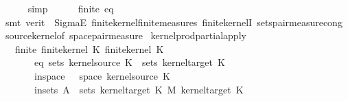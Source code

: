 \begin{isabellebody}
\ \ \ \ \isamarkupfalse%
\ simp\isanewline
\ \ \ \ \isamarkupfalse%
\ finite\ eq\isanewline
\ \ \ \ \isamarkupfalse%
\ {\isacharparenleft}{\kern0pt}smt\ {\isacharparenleft}{\kern0pt}verit{\isacharparenright}{\kern0pt}\ {}\ SigmaE\ finite{\isacharunderscore}{\kern0pt}kernel{\isachardot}{\kern0pt}finite{\isacharunderscore}{\kern0pt}measures\ finite{\isacharunderscore}{\kern0pt}kernelI\ sets{\isacharunderscore}{\kern0pt}pair{\isacharunderscore}{\kern0pt}measure{\isacharunderscore}{\kern0pt}cong\ source{\isacharunderscore}{\kern0pt}kernel{\isacharunderscore}{\kern0pt}of\ space{\isacharunderscore}{\kern0pt}pair{\isacharunderscore}{\kern0pt}measure{\isacharparenright}{\kern0pt}\isanewline
{}\isamarkupfalse%
%
\endisatagproof
{\isafoldproof}%
%
\isadelimproof
\isanewline
%
\endisadelimproof
\isanewline
{}\isamarkupfalse%
\ kernel{\isacharunderscore}{\kern0pt}prod{\isacharunderscore}{\kern0pt}partial{\isacharunderscore}{\kern0pt}apply{\isacharcolon}{\kern0pt}\isanewline
\ \ \ finite{\isacharcolon}{\kern0pt}\ {\isachardoublequoteopen}finite{\isacharunderscore}{\kern0pt}kernel\ K{\isacharunderscore}{\kern0pt}{}{\isachardoublequoteclose}\ {\isachardoublequoteopen}finite{\isacharunderscore}{\kern0pt}kernel\ K{\isacharunderscore}{\kern0pt}{}{\isachardoublequoteclose}\isanewline
\ \ \ \ \ \ \ eq{\isacharcolon}{\kern0pt}\ {\isachardoublequoteopen}sets\ {\isacharparenleft}{\kern0pt}kernel{\isacharunderscore}{\kern0pt}source\ K{\isacharunderscore}{\kern0pt}{}{\isacharparenright}{\kern0pt}\ {\isacharequal}{\kern0pt}\ sets\ {\isacharparenleft}{\kern0pt}kernel{\isacharunderscore}{\kern0pt}target\ K{\isacharunderscore}{\kern0pt}{}{\isacharparenright}{\kern0pt}{\isachardoublequoteclose}\isanewline
\ \ \ \ \ \ \ in{\isacharunderscore}{\kern0pt}space{\isacharcolon}{\kern0pt}\ {\isachardoublequoteopen}{\isasymomega}\ {\isasymin}\ space\ {\isacharparenleft}{\kern0pt}kernel{\isacharunderscore}{\kern0pt}source\ K{\isacharunderscore}{\kern0pt}{}{\isacharparenright}{\kern0pt}{\isachardoublequoteclose}\isanewline
\ \ \ \ \ \ \ in{\isacharunderscore}{\kern0pt}sets{\isacharcolon}{\kern0pt}\ {\isachardoublequoteopen}A\ {\isasymin}\ sets\ {\isacharparenleft}{\kern0pt}kernel{\isacharunderscore}{\kern0pt}target\ K{\isacharunderscore}{\kern0pt}{}\ {\isasymOtimes}\isactrlsub M\ kernel{\isacharunderscore}{\kern0pt}target\ K{\isacharunderscore}{\kern0pt}{}{\isacharparenright}{\kern0pt}{\isachardoublequoteclose}\isanewline

\end{isabellebody}
